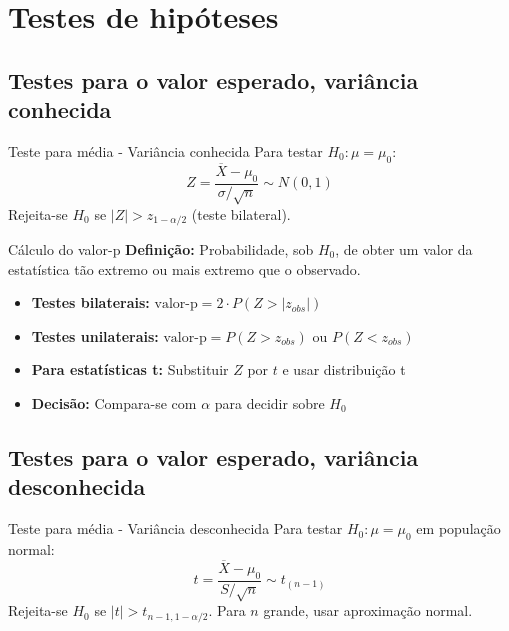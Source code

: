 \documentclass[a4paper,12pt]{article}
\begin{document}
\section{\color{sectioncolor}Testes de hipóteses}
\subsection{Testes para o valor esperado, variância conhecida}

\begin{formulabox}{Teste para média - Variância conhecida}
Para testar $H_0: \mu = \mu_0$:
\begin{equation}\label{formula29}\tag{Fórmula 29}
    Z = \frac{\overline{X} - \mu_0}{\sigma/\sqrt{n}} \sim N(0,1)
\end{equation}
Rejeita-se $H_0$ se $|Z| > z_{1-\alpha/2}$ (teste bilateral).
\end{formulabox}

\begin{formulabox}{Cálculo do valor-p}
\textbf{Definição:} Probabilidade, sob $H_0$, de obter um valor da estatística tão extremo ou mais extremo que o observado.

\begin{itemize}
    \item \textbf{Testes bilaterais:} $\text{valor-p} = 2 \cdot P(Z > |z_{obs}|)$
    \item \textbf{Testes unilaterais:} $\text{valor-p} = P(Z > z_{obs})$ ou $P(Z < z_{obs})$
    \item \textbf{Para estatísticas t:} Substituir $Z$ por $t$ e usar distribuição t
    \item \textbf{Decisão:} Compara-se com $\alpha$ para decidir sobre $H_0$
\end{itemize}
\end{formulabox}

\subsection{Testes para o valor esperado, variância desconhecida}

\begin{formulabox}{Teste para média - Variância desconhecida}
Para testar $H_0: \mu = \mu_0$ em população normal:
\begin{equation}\label{formula30}\tag{Fórmula 30}
    t = \frac{\overline{X} - \mu_0}{S/\sqrt{n}} \sim t_{(n-1)}
\end{equation}
Rejeita-se $H_0$ se $|t| > t_{n-1,1-\alpha/2}$. Para $n$ grande, usar aproximação normal.
\end{formulabox}
\end{document}
